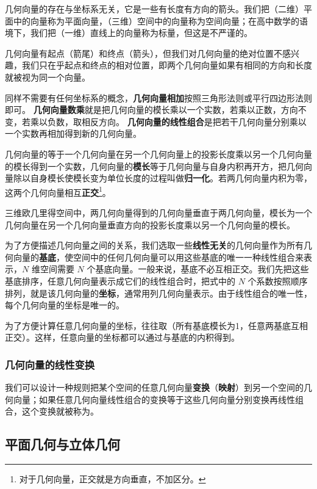 几何向量的存在与坐标系无关，它是一些有长度有方向的箭头。我们把（二维）平面中的向量称为平面向量，（三维）空间中的向量称为空间向量；在高中数学的语境下，我们把（一维）直线上的向量称为标量，但这是不严谨的。



几何向量有起点（箭尾）和终点（箭头），但我们对几何向量的绝对位置不感兴趣，我们只在乎起点和终点的相对位置，即两个几何向量如果有相同的方向和长度就被视为同一个向量。

 同样不需要有任何坐标系的概念，\textbf{几何向量相加}按照三角形法则或平行四边形法则即可。
\textbf{几何向量数乘}就是把几何向量的模长乘以一个实数，若乘以正数，方向不变，若乘以负数，取相反方向。 \textbf{几何向量的线性组合}是把若干几何向量分别乘以一个实数再相加得到新的几何向量。

几何向量的等于一个几何向量在另一个几何向量上的投影长度乘以另一个几何向量的模长得到一个实数，几何向量的\textbf{模长}等于几何向量与自身内积再开方，把几何向量除以自身模长使模长变为单位长度的过程叫做\textbf{归一化}。若两几何向量内积为零，这两个几何向量相互\textbf{正交}\footnote{对于几何向量，正交就是方向垂直，不加区分。}。

三维欧几里得空间中，两几何向量得到的几何向量垂直于两几何向量，模长为一个几何向量在另一个几何向量垂直方向的投影长度乘以另一个几何向量的模长。

为了方便描述几何向量之间的关系，我们选取一些\textbf{线性无关}的几何向量作为所有几何向量的\textbf{基底}，使空间中的任何几何向量可以用这些基底的唯一一种线性组合来表示，$N$ 维空间需要 $N$ 个基底向量。一般来说，基底不必互相正交。我们先把这些基底排序，任意几何向量表示成它们的线性组合时，把式中的 $N$ 个系数按照顺序排列，就是该几何向量的\textbf{坐标}，通常用列几何向量表示。由于线性组合的唯一性，每个几何向量的坐标是唯一的。

为了方便计算任意几何向量的坐标，往往取（所有基底模长为1，任意两基底互相正交）。这样，任意向量的坐标都可以通过与基底的内积得到。


\subsubsection{几何向量的线性变换}

我们可以设计一种规则把某个空间的任意几何向量\textbf{变换}（\textbf{映射}）到另一个空间的几何向量；如果任意几何向量线性组合的变换等于这些几何向量分别变换再线性组合，这个变换就被称为。





\subsection{平面几何与立体几何}
